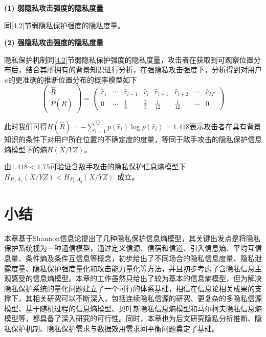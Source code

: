 \textbf{(1) 弱隐私攻击强度的隐私度量}

同\ref{4.2}节弱隐私保护强度的隐私度量。

\textbf{(2) 强隐私攻击强度的隐私度量}

隐私保护机制同\ref{4.2}节弱隐私保护强度的隐私度量，攻击者在获取到可观察位置分布后，结合其所拥有的背景知识进行分析，在强隐私攻击强度下，分析得到对用户$u$的更准确的推断位置分布的概率模型如下
\begin{equation}
\begin{pmatrix}
\hat{R}\\ 
P(\hat{R})
\end{pmatrix}=\begin{pmatrix}
\hat{r}_{1} & \cdots & \hat{r}_{i-1}  & \hat{r}_{i} & \hat{r}_{i+1} & \hat{r}_{i+2} & \cdots  & \hat{r}_{{M}'}\\ 
0 & \cdots  & \frac{1}{6} & \frac{2}{3} & \frac{1}{12} & \frac{1}{12} & \cdots  & 0
\end{pmatrix}
\end{equation}

此时我们可得$H(\hat{R})=-\sum_{i=1}^{\hat{M}}p(\hat{r}_{i})\log p(\hat{r}_{i})=1.418$表示攻击者在具有背景知识的条件下对用户所在位置的不确定度的度量，等同于敌手攻击的隐私保护信息熵模型下的熵$H(X/YZ)$。

由$1.418<1.75$可验证含敌手攻击的隐私保护信息熵模型下~$H_{P_{i},A_{r}}(X/YZ)<H_{P_{i},A_{q}}(X/YZ)$~成立。

\section{小结}\label{sconclusion}

本章基于Shannon信息论提出了几种隐私保护信息熵模型，其关键出发点是将隐私保护系统视为一种通信模型，通过定义信源、信宿和信道、引入信息熵、平均互信息量、条件熵及条件互信息等概念，初步给出了不同场合的隐私信息度量、隐私泄露度量、隐私保护强度量化和攻击能力量化等方法，并且初步考虑了含隐私信息主观感受的信息熵模型。本章的工作虽然只给出了较为基本的信息熵模型，但为解决隐私保护系统的量化问题建立了一个可行的体系基础，相信在信息论相关成果的支撑下，其相关研究可以不断深入，包括连续隐私信源的研究、更复杂的多隐私信源模型、基于随机过程的信息熵模型、贝叶斯隐私信息熵模型和马尔柯夫隐私信息熵模型等，都具备了深入研究的可行性。同时，本章也为后文研究隐私分析推断、隐私保护机制、隐私保护需求与数据效用需求间平衡问题奠定了基础。












